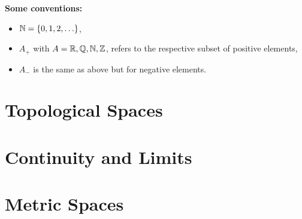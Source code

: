 \documentclass[12pt]{article}
\begin{document}
\maketitle
\tableofcontents
\newpage
\textbf{Some conventions:} 
\begin{itemize}
    \item $\mathbb{N} = \{0,1,2, \ldots \}$,
    \item $A_+$ with $A = \mathbb{R}, \mathbb{Q}, \mathbb{N}, \mathbb{Z}$, refers to the respective subset of positive elements,
    \item $A_-$ is the same as above but for negative elements. 
\end{itemize}
\section{Topological Spaces}

\section{Continuity and Limits}

\section{Metric Spaces}

\end{document}
